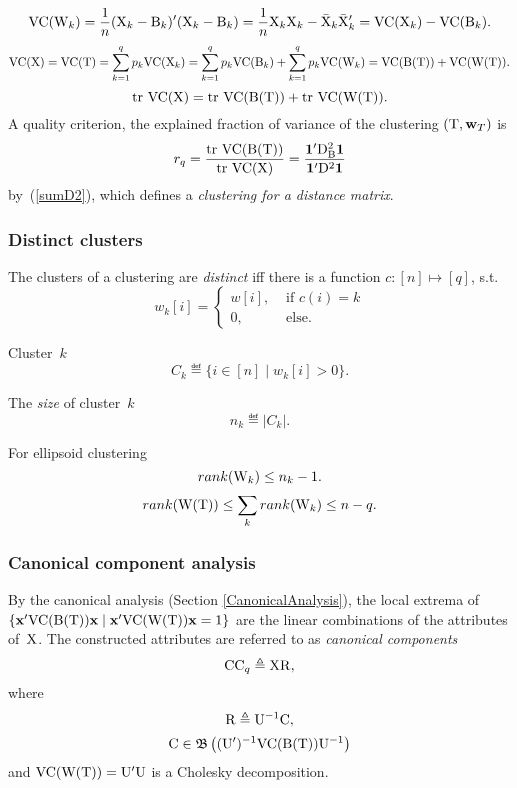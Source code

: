\documentclass[10pt,a4paper]{article}
\theoremstyle{plain} \newtheorem{Lem}{Lemma}
\begin{document}
\bigskip
$$ \mathrm {VC}(\mathrm W_k) = \frac 1 n (\mathrm X_k - \mathrm B_k)' (\mathrm X_k - \mathrm B_k) = \frac 1 n \mathrm X_k \mathrm X_k - \bar {\mathrm X}_k \bar {\mathrm X}_k' = \mathrm {VC}(\mathrm X_k) - \mathrm {VC}(\mathrm B_k). $$
$$ \mathrm {VC}(\mathrm X) = \mathrm {VC}(\mathrm T) = \sum_{k=1}^q p_k \mathrm {VC}(\mathrm X_k) = \sum_{k=1}^q p_k \mathrm {VC}(\mathrm B_k) + \sum_{k=1}^q p_k \mathrm {VC}(\mathrm W_k) = \mathrm {VC}(\mathrm B(\mathrm T)) + \mathrm {VC}(\mathrm W(\mathrm T)). $$
$$ \mathrm {tr} \  \mathrm {VC}(\mathrm X) = \mathrm {tr} \  \mathrm {VC}(\mathrm B(\mathrm T)) + \mathrm {tr} \  \mathrm {VC}(\mathrm W(\mathrm T)). $$
A quality criterion, the explained fraction of variance of the clustering $(\mathrm T, \mathbf w_T)$ is
$$ r_q = \frac {\mathrm {tr} \  \mathrm {VC}(\mathrm B(\mathrm T))} {\mathrm {tr} \  \mathrm {VC}(\mathrm X)} = \frac {\mathbf 1' \mathrm D^2_{\mathrm B} \mathbf 1} {\mathbf 1' \mathrm D^2 \mathbf 1} 
$$
by~(\ref{sumD2}),
which defines a {\em clustering for a distance matrix}.


\subsubsection {Distinct clusters}
The clusters of a clustering are {\em distinct} iff there is a function $c : [n] \mapsto [q]$, s.t.
\begin{equation*}
  w_k[i] =
    \begin{cases}
      w[i], &\text{ if } c(i) = k\\
      0,   &\text{ else}.
    \end{cases}
\end{equation*}

Cluster~$k$
$$ C_k \eqdef \{i \in [n] \mid w_k[i] > 0\}. $$

The {\em size} of cluster~$k$
$$ n_k \eqdef |C_k|. $$

For ellipsoid clustering
$$ rank(\mathrm W_k) \le n_k - 1. $$
$$ rank(\mathrm W(\mathrm T)) \le \sum_k rank(\mathrm W_k) \le n - q. $$


\subsubsection{Canonical component analysis}
By the canonical analysis (Section \ref{CanonicalAnalysis}), 
the local extrema of $\{\mathbf x' \mathrm {VC}(\mathrm B(\mathrm T)) \mathbf x \mid \mathbf x' \mathrm {VC} (\mathrm W(\mathrm T)) \mathbf x = 1\}$
are the linear combinations of the attributes of~$\mathrm X$.
The constructed attributes are referred to as {\em canonical components}
$$ \mathrm {CC}_q \triangleq \mathrm X \mathrm R, $$
where 
$$ \mathrm R \triangleq \mathrm U^{-1} \mathrm C, $$
$$ \mathrm C \in \mathfrak B \left((\mathrm U')^{-1} \mathrm {VC}(\mathrm B(\mathrm T)) \mathrm U^{-1} \right) $$
and $\mathrm {VC}(\mathrm W(\mathrm T)) = \mathrm U' \mathrm U$ is a Cholesky decomposition.
\end{document}
